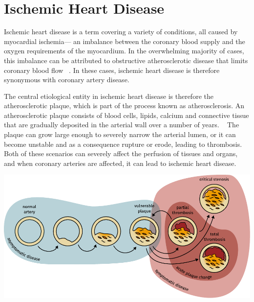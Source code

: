 \chapter{Ischemic Heart Disease}
\label{ihd-background}

Ischemic heart disease is a term covering a variety of conditions, 
all caused by myocardial ischemia---%
an imbalance between the coronary blood supply and the 
oxygen requirements of the myocardium.
In the overwhelming majority of cases, 
this imbalance can be attributed to obstructive atherosclerotic disease 
that limits coronary blood flow
~\autocite{kumarRobbins2017}.
In these cases, ischemic heart disease is therefore synonymous 
with coronary artery disease.

The central etiological entity in ischemic heart disease
is therefore the atherosclerotic plaque, 
which is part of the process known as atherosclerosis. 
An atherosclerotic plaque consists of blood cells, lipids, calcium 
and connective tissue that are gradually deposited in the arterial wall 
over a number of years.
~\autocite{kumarRobbins2017}
The plaque can grow large enough to severely narrow the arterial lumen,
or it can become unstable and as a consequence rupture or erode,
leading to thrombosis.
Both of these scenarios can severely affect 
the perfusion of tissues and organs, 
and when coronary arteries are affected,
it can lead to ischemic heart disease.

\begin{figurefw}
    \centering
    \vspace{-5em}
	\includegraphics[width=\linewidth]{graphics/atherosclerosis}
    \caption[The process of atherosclerosis]{%
        \textit{Critical stenosis} represents the tipping point at which
        the gradual occlusion of the arteries leads to onset of symptoms.
        While the patient may be asymptomatic at rest, 
        increased physical activity results in cardiac ischemia and  
        intense chest pain.
        \textit{Acute plaque change} is the sudden rupture or erosion of 
        the atherosclerotic plaque which triggers thrombosis.
        The resulting thrombus can partially or completely fill the vascular
        lumen.
        Disruption of endothelial integrity.
    }
    \label{OneOfMyMissingFigures}
\end{figurefw}

